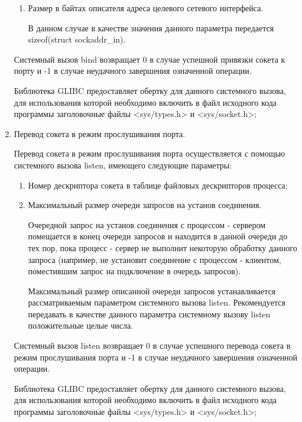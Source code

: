\begin{enumerate}
\begin{enumerate}
					\item Размер в байтах описателя адреса целевого сетевого интерфейса.

					В данном случае в качестве значения данного параметра передается\\sizeof(struct sockaddr\_in).

				\end{enumerate}

			Системный вызов bind возвращает 0 в случае успешной привязки сокета к порту и -1 в случае неудачного завершения означенной операции.

			Библиотека GLIBC предоставляет обертку для данного системного вызова, для использования которой необходимо включить в файл исходного кода программы
			заголовочные файлы <sys/types.h> и <sys/socket.h>;

		\item Перевод сокета в режим прослушивания порта.

			Перевод сокета в режим прослушивания порта осуществляется с помощью системного вызова listen, имеющего следующие параметры:

				\begin{enumerate}

					\item Номер дескриптора сокета в таблице файловых дескрипторов процесса;

					\item Максимальный размер очереди запросов на установ соединения.

						Очередной запрос на установ соединения с процессом - сервером помещается в конец очереди запросов и находится в данной очереди до тех пор,
						пока процесс - сервер не выполнит некоторую обработку данного запроса (например, не установит соединение с процессом - клиентом,
						поместившим запрос на подключение в очередь запросов).

						Максимальный размер описанной очереди запросов устанавливается рассматриваемым параметром системного вызова listen.
						Рекомендуется передавать в качестве данного параметра системному вызову listen положительные целые числа.

				\end{enumerate}

			Системный вызов listen возвращает 0 в случае успешного перевода сокета в режим прослушивания порта и -1 в случае неудачного завершения
			означенной операции.

			Библиотека GLIBC предоставляет обертку для данного системного вызова, для использования которой необходимо включить в файл исходного кода программы
			заголовочные файлы <sys/types.h> и <sys/socket.h>;


\end{enumerate}
